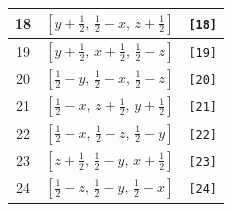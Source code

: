\documentclass[fleqn,8pt]{jsarticle}
\begin{document}
\begin{longtable}{ccc}
18 & $\left[ y + \frac{1}{2},\, \frac{1}{2} - x,\, z + \frac{1}{2} \right]$ & {\tt [18]} \\ \hline
19 & $\left[ y + \frac{1}{2},\, x + \frac{1}{2},\, \frac{1}{2} - z \right]$ & {\tt [19]} \\ \hline
20 & $\left[ \frac{1}{2} - y,\, \frac{1}{2} - x,\, \frac{1}{2} - z \right]$ & {\tt [20]} \\ \hline
21 & $\left[ \frac{1}{2} - x,\, z + \frac{1}{2},\, y + \frac{1}{2} \right]$ & {\tt [21]} \\ \hline
22 & $\left[ \frac{1}{2} - x,\, \frac{1}{2} - z,\, \frac{1}{2} - y \right]$ & {\tt [22]} \\ \hline
23 & $\left[ z + \frac{1}{2},\, \frac{1}{2} - y,\, x + \frac{1}{2} \right]$ & {\tt [23]} \\ \hline
24 & $\left[ \frac{1}{2} - z,\, \frac{1}{2} - y,\, \frac{1}{2} - x \right]$ & {\tt [24]} \\
\end{longtable}
\end{document}
